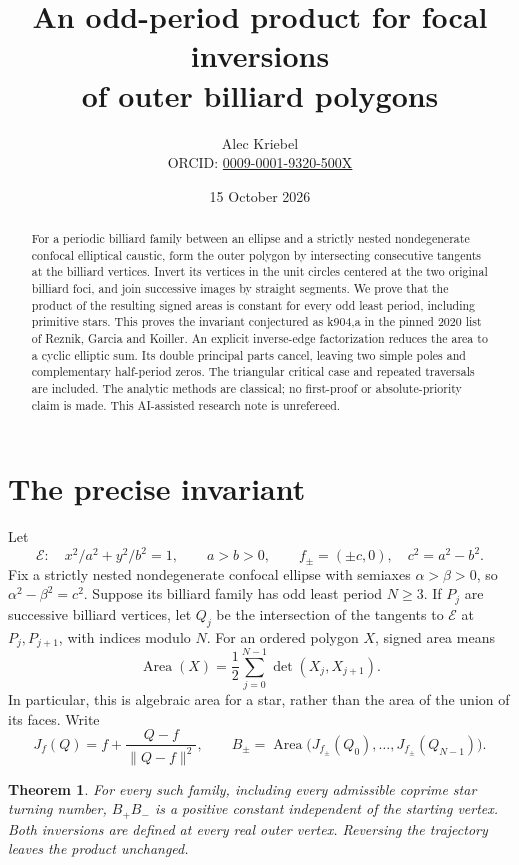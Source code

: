 \documentclass[11pt]{article}
\title{An odd-period product for focal inversions\protect\\of outer billiard polygons}
\author{Alec Kriebel\\\small ORCID: \href{https://orcid.org/0009-0001-9320-500X}{0009-0001-9320-500X}}
\date{15 October 2026}
\newtheorem{theorem}{Theorem}
\newcommand{\Area}{\operatorname{Area}}
\begin{document}
\maketitle
\begin{abstract}
For a periodic billiard family between an ellipse and a strictly nested nondegenerate confocal elliptical caustic, form the outer polygon by intersecting consecutive tangents at the billiard vertices. Invert its vertices in the unit circles centered at the two original billiard foci, and join successive images by straight segments. We prove that the product of the resulting signed areas is constant for every odd least period, including primitive stars. This proves the invariant conjectured as k904,a in the pinned 2020 list of Reznik, Garcia and Koiller. An explicit inverse-edge factorization reduces the area to a cyclic elliptic sum. Its double principal parts cancel, leaving two simple poles and complementary half-period zeros. The triangular critical case and repeated traversals are included. The analytic methods are classical; no first-proof or absolute-priority claim is made. This AI-assisted research note is unrefereed.
\end{abstract}

\section{The precise invariant}
Let
\[
 \mathcal E:\quad x^2/a^2+y^2/b^2=1,\qquad
 a>b>0,\qquad f_\pm=(\pm c,0),\quad c^2=a^2-b^2.
\]
Fix a strictly nested nondegenerate confocal ellipse with semiaxes
$\alpha>\beta>0$, so $\alpha^2-\beta^2=c^2$. Suppose its billiard family has odd least period $N\geq3$. If $P_j$ are successive billiard vertices, let $Q_j$ be the intersection of the tangents to $\mathcal E$ at $P_j,P_{j+1}$, with indices modulo $N$. For an ordered polygon $X$, signed area means
\[
 \Area(X)=\frac12\sum_{j=0}^{N-1}\det(X_j,X_{j+1}).
\]
In particular, this is algebraic area for a star, rather than the area of the union of its faces. Write
\[
 J_f(Q)=f+\frac{Q-f}{\lVert Q-f\rVert^2},\qquad
 B_\pm=\Area\bigl(J_{f_\pm}(Q_0),\ldots,J_{f_\pm}(Q_{N-1})\bigr).
\]
\begin{theorem}\label{thm:main}
For every such family, including every admissible coprime star turning number, $B_+B_-$ is a positive constant independent of the starting vertex. Both inversions are defined at every real outer vertex. Reversing the trajectory leaves the product unchanged.
\end{theorem}
\end{document}
